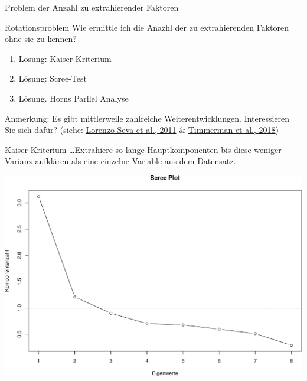 \documentclass[
  ignorenonframetext,
]{beamer}
\providecommand{\tightlist}{%
  \setlength{\itemsep}{0pt}\setlength{\parskip}{0pt}}
\begin{document}
\begin{frame}{Problem der Anzahl zu extrahierender Faktoren}
\protect\hypertarget{problem-der-anzahl-zu-extrahierender-faktoren}{}
\begin{alertblock}{Rotationsproblem}
  Wie ermittle ich die Anazhl der zu extrahierenden Faktoren ohne sie zu kennen?
\end{alertblock}

\begin{enumerate}
\tightlist
\item
  Lösung: Kaiser Kriterium
\item
  Lösung: Scree-Test
\item
  Lösung. Horns Parllel Analyse
\end{enumerate}

Anmerkung: Es gibt mittlerweile zahlreiche Weiterentwicklungen.
Interessieren Sie sich dafür? (siehe:
\href{https://sci-hub.se/10.1080/00273171.2011.564527}{Lorenzo-Seva et
al., 2011} \&
\href{https://doi.org/10.1002/9781118489772.ch11}{Timmerman et al.,
2018})
\end{frame}

\begin{frame}{Kaiser Kriterium}
\protect\hypertarget{kaiser-kriterium}{}
\ldots Extrahiere so lange Hauptkomponenten bis diese weniger Varianz
aufklären als eine einzelne Variable aus dem Datensatz.

\includegraphics{06-EFA_files/figure-beamer/unnamed-chunk-11-1.pdf}
\end{frame}
\end{document}
